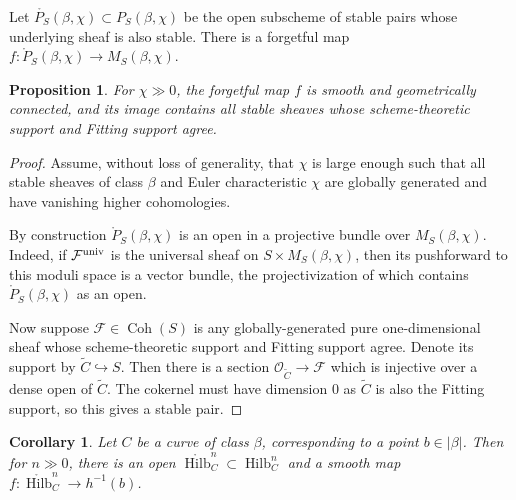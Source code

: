 \documentclass{amsart}
\theoremstyle{plain}
\newtheorem{proposition}[theorem]{Proposition}
\newtheorem{corollary}[theorem]{Corollary}
\theoremstyle{definition}
\theoremstyle{remark}
\begin{document}
Let $\mathring{P_S}(\beta,\chi) \subset P_S(\beta,\chi)$ be the open subscheme of stable pairs whose underlying sheaf is also stable.
There is a forgetful map $f: \mathring P_S(\beta,\chi)\rightarrow M_S(\beta,\chi)$.
\begin{proposition}\label{prop:paircover}
    For $\chi\gg0$, the forgetful map $f$ is smooth and geometrically connected, and its image contains all stable sheaves whose scheme-theoretic support and Fitting support agree.
\end{proposition}
\begin{proof}
    Assume, without loss of generality, that $\chi$ is large enough such that all stable sheaves of class $\beta$ and Euler characteristic $\chi$ are globally generated and have vanishing higher cohomologies.

    By construction $\mathring P_S(\beta,\chi)$ is an open in a projective bundle over $M_S(\beta,\chi)$.
    Indeed, if $\mathcal F^{\rm univ}$ is the universal sheaf on $S\times M_{S}(\beta,\chi)$, then its pushforward to this moduli space is a vector bundle, the projectivization of which contains $\mathring P_S(\beta,\chi)$ as an open.

    Now suppose $\mathcal F\in\operatorname{Coh}(S)$ is any globally-generated pure one-dimensional sheaf whose scheme-theoretic support and Fitting support agree.
    Denote its support by $\widetilde C\hookrightarrow S$.
    Then there is a section $\mathcal O_{\widetilde C}\to\mathcal  F$ which is injective over a dense open of $\widetilde{C}$.
    The cokernel must have dimension $0$ as $\widetilde{C}$ is also the Fitting support, so this gives a stable pair.
\end{proof}

\begin{corollary}\label{cor:hilbcover}
    Let $C$ be a curve of class $\beta$, corresponding to a point $b\in |\beta|$. Then for $n\gg0$, there is an open $\mathring{\operatorname{Hilb}}^n_C\subset \operatorname{Hilb}^n_C$ and a smooth map $f:\mathring{\operatorname{Hilb}}^n_C \rightarrow h^{-1}(b)$.
\end{corollary}
\end{document}
